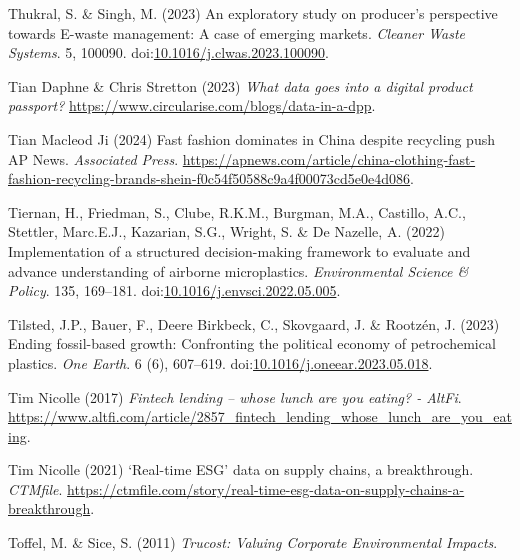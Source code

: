 \documentclass[
  letterpaper,
  DIV=11,
  numbers=noendperiod]{scrartcl}
\newlength{\cslhangindent}
\newenvironment{CSLReferences}[2] %
 {\begin{list}{}{%
  \setlength{\itemindent}{0pt}
  \setlength{\leftmargin}{0pt}
  \setlength{\parsep}{0pt}
  \ifodd #1
   \setlength{\leftmargin}{\cslhangindent}
   \setlength{\itemindent}{-1\cslhangindent}
  \fi
  \setlength{\itemsep}{#2\baselineskip}}}
 {\end{list}}
\begin{document}
\begin{CSLReferences}{0}{1}
Thukral, S. \& Singh, M. (2023) An exploratory study on producer's
perspective towards {E-waste} management: {A} case of emerging markets.
\emph{Cleaner Waste Systems}. 5, 100090.
doi:\href{https://doi.org/10.1016/j.clwas.2023.100090}{10.1016/j.clwas.2023.100090}.

Tian Daphne \& Chris Stretton (2023) \emph{What data goes into a digital
product passport?}
\url{https://www.circularise.com/blogs/data-in-a-dpp}.

Tian Macleod Ji (2024) Fast fashion dominates in {China} despite
recycling push {\textbar} {AP News}. \emph{Associated Press}.
\url{https://apnews.com/article/china-clothing-fast-fashion-recycling-brands-shein-f0c54f50588c9a4f00073cd5e0e4d086}.

Tiernan, H., Friedman, S., Clube, R.K.M., Burgman, M.A., Castillo, A.C.,
Stettler, Marc.E.J., Kazarian, S.G., Wright, S. \& De Nazelle, A. (2022)
Implementation of a structured decision-making framework to evaluate and
advance understanding of airborne microplastics. \emph{Environmental
Science \& Policy}. 135, 169--181.
doi:\href{https://doi.org/10.1016/j.envsci.2022.05.005}{10.1016/j.envsci.2022.05.005}.

Tilsted, J.P., Bauer, F., Deere Birkbeck, C., Skovgaard, J. \& Rootzén,
J. (2023) Ending fossil-based growth: {Confronting} the political
economy of petrochemical plastics. \emph{One Earth}. 6 (6), 607--619.
doi:\href{https://doi.org/10.1016/j.oneear.2023.05.018}{10.1016/j.oneear.2023.05.018}.

Tim Nicolle (2017) \emph{Fintech lending -- whose lunch are you eating?
- {AltFi}}.
\url{https://www.altfi.com/article/2857_fintech_lending_whose_lunch_are_you_eating}.

Tim Nicolle (2021) {`{Real-time ESG}'} data on supply chains, a
breakthrough. \emph{CTMfile}.
\url{https://ctmfile.com/story/real-time-esg-data-on-supply-chains-a-breakthrough}.

Toffel, M. \& Sice, S. (2011) \emph{Trucost: {Valuing Corporate
Environmental Impacts}}.


\end{CSLReferences}
\end{document}
